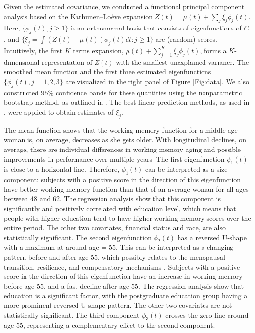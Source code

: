 \documentclass[11pt]{article}
\newcommand{\0}{{\mathbf{0}}}
\newcommand{\1}{{\mathbf{1}}}
\begin{document}
Given the estimated covariance, we conducted a functional principal component analysis based on the Karhunen--Lo\`eve expansion $Z(t) = \mu(t) + \sum_j \xi_j\phi_j(t)$. Here, $\{\phi_j(t), j\geq 1\}$ is an orthonormal basis that consists of eigenfunctions of $G$, and $\{\xi_j = \int (Z(t)-\mu(t))\phi_j(t)dt: j\geq 1\}$ are (random) scores. Intuitively, the first $K$ terms expansion, $\mu(t) + \sum_{j=1}^{K} \xi_j\phi_j(t)$, forms a $K$-dimensional representation of $Z(t)$ with the smallest unexplained variance.  
The smoothed mean function and the first three estimated eigenfunctions $\{\phi_j(t), j = 1, 2, 3\}$ are visualized in the right panel of Figure \ref{Fig:data}. We also constructed 95\% confidence bands for these quantities using the nonparametric bootstrap method, as outlined in \cite{hall2006properties}. The best linear prediction methods, as used in \cite{yao2005functional}, were applied to obtain estimates of $\xi_{j}$.

The mean function shows that the working memory function for a middle-age woman is, on average, decreases as she gets older. With longitudinal declines, on average, there are individual differences in working memory aging and possible improvements in performance over multiple years. The first eigenfunction $\phi_1(t)$ is close to a horizontal line. Therefore, $\phi_1(t)$ can be interpreted as a size component: subjects with a positive score in the direction of this eigenfunction have better working memory function than that of an average woman for all ages between 48 and 62. The regression analysis show that this component is significantly and positively correlated with education level, which means that people with higher education tend to have higher working memory scores over the entire period. The other two covariates, financial status and race, are also statistically significant.
The second eigenfunction $\phi_2(t)$ has a reversed U-shape with a maximum at around age = 55. This can be interpreted as a changing pattern before and after age 55, which possibly relates to the menopausal transition, resilience, and compensatory mechanisms \citep{fuh2006longitudinal,greendale2009effects,hahn2015everyday}. Subjects with a positive score in the direction of this eigenfunction have an increase in working memory before age 55, and a fast decline after age 55. The regression analysis show that education is a significant factor, with the postgraduate education group having a more prominent reversed U-shape pattern. The other two covariates are not statistically significant. 
The third component $\phi_3(t)$ crosses the zero line around age 55, representing a complementary effect to the second component. 
\end{document}
